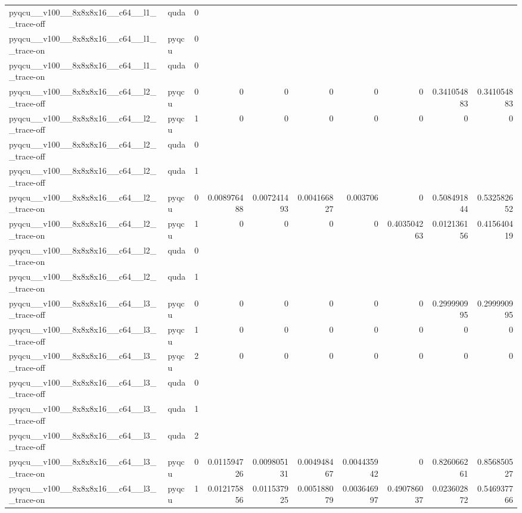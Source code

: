 \begin{table}[htbp]
\begin{tabular}{@{}llrrrrrrrr@{}}
pyqcu\_\_v100\_\_8x8x8x16\_\_c64\_\_l1\_\_trace-off & quda & 0 &  &  &  &  &  &  &  \\
pyqcu\_\_v100\_\_8x8x8x16\_\_c64\_\_l1\_\_trace-on & pyqcu & 0 &  &  &  &  &  &  &  \\
pyqcu\_\_v100\_\_8x8x8x16\_\_c64\_\_l1\_\_trace-on & quda & 0 &  &  &  &  &  &  &  \\
pyqcu\_\_v100\_\_8x8x8x16\_\_c64\_\_l2\_\_trace-off & pyqcu & 0 & 0 & 0 & 0 & 0 & 0 & 0.341054883 & 0.341054883 \\
pyqcu\_\_v100\_\_8x8x8x16\_\_c64\_\_l2\_\_trace-off & pyqcu & 1 & 0 & 0 & 0 & 0 & 0 & 0 & 0 \\
pyqcu\_\_v100\_\_8x8x8x16\_\_c64\_\_l2\_\_trace-off & quda & 0 &  &  &  &  &  &  &  \\
pyqcu\_\_v100\_\_8x8x8x16\_\_c64\_\_l2\_\_trace-off & quda & 1 &  &  &  &  &  &  &  \\
pyqcu\_\_v100\_\_8x8x8x16\_\_c64\_\_l2\_\_trace-on & pyqcu & 0 & 0.008976488 & 0.007241493 & 0.004166827 & 0.003706 & 0 & 0.508491844 & 0.532582652 \\
pyqcu\_\_v100\_\_8x8x8x16\_\_c64\_\_l2\_\_trace-on & pyqcu & 1 & 0 & 0 & 0 & 0 & 0.403504263 & 0.012136156 & 0.415640419 \\
pyqcu\_\_v100\_\_8x8x8x16\_\_c64\_\_l2\_\_trace-on & quda & 0 &  &  &  &  &  &  &  \\
pyqcu\_\_v100\_\_8x8x8x16\_\_c64\_\_l2\_\_trace-on & quda & 1 &  &  &  &  &  &  &  \\
pyqcu\_\_v100\_\_8x8x8x16\_\_c64\_\_l3\_\_trace-off & pyqcu & 0 & 0 & 0 & 0 & 0 & 0 & 0.299990995 & 0.299990995 \\
pyqcu\_\_v100\_\_8x8x8x16\_\_c64\_\_l3\_\_trace-off & pyqcu & 1 & 0 & 0 & 0 & 0 & 0 & 0 & 0 \\
pyqcu\_\_v100\_\_8x8x8x16\_\_c64\_\_l3\_\_trace-off & pyqcu & 2 & 0 & 0 & 0 & 0 & 0 & 0 & 0 \\
pyqcu\_\_v100\_\_8x8x8x16\_\_c64\_\_l3\_\_trace-off & quda & 0 &  &  &  &  &  &  &  \\
pyqcu\_\_v100\_\_8x8x8x16\_\_c64\_\_l3\_\_trace-off & quda & 1 &  &  &  &  &  &  &  \\
pyqcu\_\_v100\_\_8x8x8x16\_\_c64\_\_l3\_\_trace-off & quda & 2 &  &  &  &  &  &  &  \\
pyqcu\_\_v100\_\_8x8x8x16\_\_c64\_\_l3\_\_trace-on & pyqcu & 0 & 0.011594726 & 0.009805131 & 0.004948467 & 0.004435942 & 0 & 0.826066261 & 0.856850527 \\
pyqcu\_\_v100\_\_8x8x8x16\_\_c64\_\_l3\_\_trace-on & pyqcu & 1 & 0.012175856 & 0.011537925 & 0.005188079 & 0.003646997 & 0.490786037 & 0.023602872 & 0.546937766 \\

\end{tabular}
\end{table}
